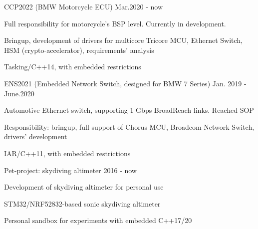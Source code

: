 


\begin{cventries}


\cventry
{} %
{CCP2022 (BMW Motorcycle ECU)} %
{} %
{Mar.2020 - now} %
{ %
\begin{cvitems}
\item {Full responsibility for motorcycle's BSP level. Currently in development.}
\item {Bringup, development of drivers for multicore Tricore MCU, Ethernet Switch, HSM (crypto-accelerator), requirements' analysis}
\item {Tasking/C++14, with embedded restrictions}
\end{cvitems}
}
\newline
\newline

\cventry
{} %
{ENS2021 (Embedded Network Switch, designed for BMW 7 Series)} %
{} %
{Jan. 2019 - June.2020} %
{ %
\begin{cvitems}
\item {Automotive Ethernet switch, supporting 1 Gbps BroadReach links. Reached SOP}
\item {Responsibility: bringup, full support of Chorus MCU, Broadcom Network Switch, drivers' development}
\item {IAR/C++11, with embedded restrictions}
\end{cvitems}
}
\newline
\newline


\cventry
{} %
{Pet-project: skydiving altimeter} %
{} %
{2016 - now} %
{ %
\begin{cvitems}
\item {Development of skydiving altimeter for personal use}
\item {STM32/NRF52832-based sonic skydiving altimeter}
\item {Personal sandbox for experiments with embedded C++17/20}
\end{cvitems}
}
\newline
\newline

\end{cventries}